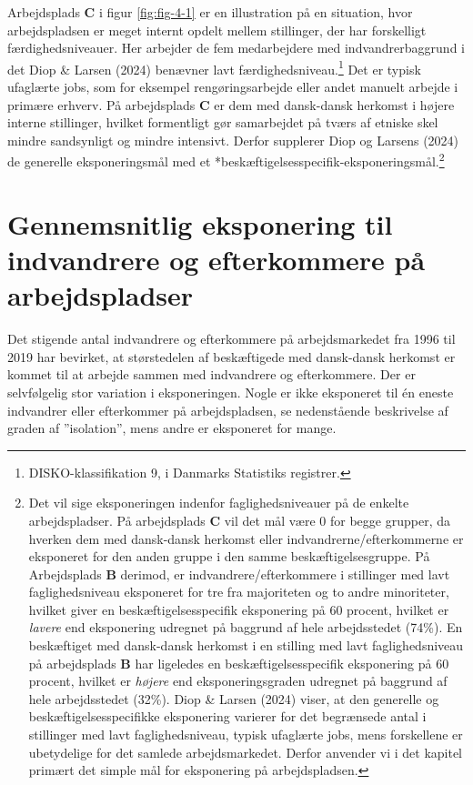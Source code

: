 \documentclass[
]{book}
\begin{document}
Arbejdsplads \textbf{C} i figur \ref{fig:fig-4-1} er en illustration på en situation, hvor arbejdspladsen er meget internt opdelt mellem stillinger, der har forskelligt færdighedsniveauer. Her arbejder de fem medarbejdere med indvandrerbaggrund i det Diop \& Larsen (2024) benævner lavt færdighedsniveau.\footnote{DISKO-klassifikation 9, i Danmarks Statistiks registrer.} Det er typisk ufaglærte jobs, som for eksempel rengøringsarbejde eller andet manuelt arbejde i primære erhverv. På arbejdsplads \textbf{C} er dem med dansk-dansk herkomst i højere interne stillinger, hvilket formentligt gør samarbejdet på tværs af etniske skel mindre sandsynligt og mindre intensivt. Derfor supplerer Diop og Larsens (2024) de generelle eksponeringsmål med et *beskæftigelsesspecifik-eksponeringsmål.\footnote{Det vil sige eksponeringen indenfor faglighedsniveauer på de enkelte arbejdspladser. På arbejdsplads \textbf{C} vil det mål være 0 for begge grupper, da hverken dem med dansk-dansk herkomst eller indvandrerne/efterkommerne er eksponeret for den anden gruppe i den samme beskæftigelsesgruppe. På Arbejdsplads \textbf{B} derimod, er indvandrere/efterkommere i stillinger med lavt faglighedsniveau eksponeret for tre fra majoriteten og to andre minoriteter, hvilket giver en beskæftigelsesspecifik eksponering på 60 procent, hvilket er \emph{lavere} end eksponering udregnet på baggrund af hele arbejdsstedet (74\%). En beskæftiget med dansk-dansk herkomst i en stilling med lavt faglighedsniveau på arbejdsplads \textbf{B} har ligeledes en beskæftigelsesspecifik eksponering på 60 procent, hvilket er \emph{højere} end eksponeringsgraden udregnet på baggrund af hele arbejdsstedet (32\%). Diop \& Larsen (2024) viser, at den generelle og beskæftigelsesspecifikke eksponering varierer for det begrænsede antal i stillinger med lavt faglighedsniveau, typisk ufaglærte jobs, mens forskellene er ubetydelige for det samlede arbejdsmarkedet. Derfor anvender vi i det kapitel primært det simple mål for eksponering på arbejdspladsen.}

\section{Gennemsnitlig eksponering til indvandrere og efterkommere på arbejdspladser}\label{gennemsnitlig-eksponering-til-indvandrere-og-efterkommere-puxe5-arbejdspladser}

Det stigende antal indvandrere og efterkommere på arbejdsmarkedet fra 1996 til 2019 har bevirket, at størstedelen af beskæftigede med dansk-dansk herkomst er kommet til at arbejde sammen med indvandrere og efterkommere. Der er selvfølgelig stor variation i eksponeringen. Nogle er ikke eksponeret til én eneste indvandrer eller efterkommer på arbejdspladsen, se nedenstående beskrivelse af graden af ''isolation'', mens andre er eksponeret for mange.
\end{document}
